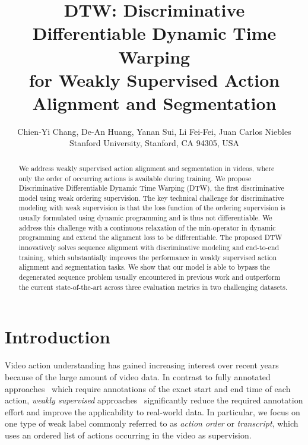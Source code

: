 \documentclass[10pt,twocolumn,letterpaper]{article}
\newcommand{\dttw}{DTW\xspace}
\begin{document}
\title{DTW: Discriminative Differentiable Dynamic Time Warping \\ for Weakly Supervised Action Alignment and Segmentation}
\vspace{-2mm}
\author{Chien-Yi Chang, De-An Huang, Yanan Sui, Li Fei-Fei, Juan Carlos Niebles\\
Stanford University, Stanford, CA 94305, USA\\
}

\maketitle
\thispagestyle{empty}

\begin{abstract} 
We address weakly supervised action alignment and segmentation in videos, where only the order of occurring actions is available during training.
We propose Discriminative Differentiable Dynamic Time Warping (DTW), the first discriminative model using weak ordering supervision. The key technical challenge for discriminative modeling with weak supervision is that the loss function of the ordering supervision is usually formulated using dynamic programming and is thus not differentiable. We address this challenge with a continuous relaxation of the min-operator in dynamic programming and extend the alignment loss to be differentiable. The proposed \dttw innovatively solves sequence alignment with discriminative modeling and end-to-end training, which substantially improves the performance in weakly supervised action alignment and segmentation tasks. We show that our model is able to bypass the degenerated sequence problem usually encountered in previous work and outperform the current state-of-the-art across three evaluation metrics in two challenging datasets.
\end{abstract} \section{Introduction}
\label{sec:introduction}

Video action understanding has gained increasing interest over recent years because of the large amount of video data.
In contrast to fully annotated approaches~\cite{kuehne2014language,rohrbach2012database,yeung2015every} which require annotations of the exact start and end time of each action, \emph{weakly supervised} approaches~\cite{ding2018weakly,huang2016connectionist,richard2018neuralnetwork,bojanowski2014weakly,kuehne2017weakly} significantly reduce the required annotation effort and improve the applicability to real-world data. In particular, we focus on one type of weak label commonly referred to as \emph{action order} or \emph{transcript}, which uses an ordered list of actions occurring in the video as supervision. 
\end{document}
